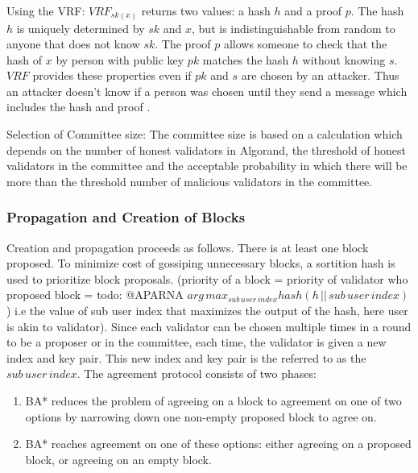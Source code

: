 \documentclass[10pt,journal,compsoc]{IEEEtran}
\newcommand\alberto[1]{\todo[color=yellow,inline]{\textbf{Alberto:} #1}}
\begin{document}
Using the VRF: $VRF_{sk(x)}$ returns two values: a hash $h$ and a proof $p$. The hash $h$ is uniquely determined by $sk$ and $x$, but is indistinguishable from random to anyone that does not know $sk$. The proof $p$ allows someone to check that the hash of $x$ by person with public key $pk$ matches the hash $h$ without knowing $s$. $VRF$ provides these properties even if $pk$ and $s$ are chosen by an attacker. Thus an attacker doesn't know if a person was chosen until they send a message which includes the hash and proof \alberto{Is $s=sk$ ?}.

Selection of Committee size: The committee size is based on a calculation which depends on the number of honest validators in Algorand, the threshold of honest validators in the committee and the acceptable probability in which there will be more than the threshold number of malicious validators in the committee. 

\subsubsection{Propagation and Creation of Blocks}
Creation and propagation proceeds as follows. There is at least one block proposed. To minimize cost of gossiping unnecessary blocks, a sortition hash is used to prioritize block proposals. (priority of a block = priority of validator who proposed block = todo: @APARNA $arg\,max_{sub\,user\, index}hash(h\,||\,sub\,user\,index)$) i.e the value of sub user index that maximizes the output of the hash, here user is akin to validator). Since each validator can be chosen multiple times in a round to be a proposer or in the committee, each time, the validator is given a new index and key pair. This new index and key pair is the referred to as the $sub\,user\,index$.
The agreement protocol consists of two phases: 
\begin{enumerate}
    \item BA* reduces the problem of agreeing on a block to agreement on one of two options by narrowing down one non-empty proposed block to agree on.
    \item BA* reaches agreement on one of these options: either agreeing on a proposed block, or agreeing on an empty block. 
\end{enumerate}
\alberto{What is BA*?}
\end{document}
